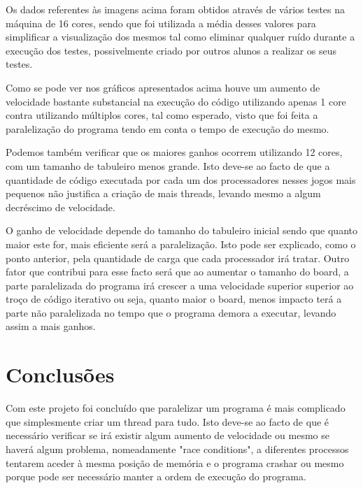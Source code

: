 \documentclass[a4paper]{article}
\begin{document}
Os dados referentes às imagens acima foram obtidos através de vários testes na máquina de 16 cores, sendo que foi utilizada a média desses valores para simplificar a visualização dos mesmos tal como eliminar qualquer ruído durante a execução dos testes, possivelmente criado por outros alunos a realizar os seus testes.

Como se pode ver nos gráficos apresentados acima houve um aumento de velocidade bastante substancial na execução do código utilizando apenas 1 core contra utilizando múltiplos cores, tal como esperado, visto que foi feita a paralelização do programa tendo em conta o tempo de execução do mesmo.


Podemos também verificar que os maiores ganhos ocorrem utilizando 12 cores, com um tamanho de tabuleiro menos grande. Isto deve-se ao facto de que a quantidade de código executada por cada um dos processadores nesses jogos mais pequenos não justifica a criação de mais threads, levando mesmo a algum decréscimo de velocidade. 

O ganho de velocidade depende do tamanho do tabuleiro inicial sendo que quanto maior este for, mais eficiente será a paralelização. Isto pode ser explicado, como o ponto anterior, pela quantidade de carga que cada processador irá tratar. Outro fator que contribui para esse facto será que ao aumentar o tamanho do board, a parte paralelizada do programa irá crescer a uma velocidade superior superior ao troço de código iterativo ou seja, quanto maior o board, menos impacto terá a parte não paralelizada no tempo que o programa demora a executar, levando assim a mais ganhos.

\section{Conclusões}
Com este projeto foi concluído que paralelizar um programa é mais complicado que simplesmente criar um thread para tudo. Isto deve-se ao facto de que é necessário verificar se irá existir algum aumento de velocidade ou mesmo se haverá algum problema, nomeadamente "race conditions", a diferentes processos tentarem aceder à mesma posição de memória e o programa crashar ou mesmo porque pode ser necessário manter a ordem de execução do programa. 
\end{document}
